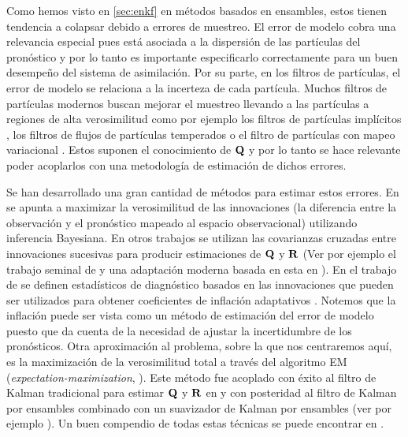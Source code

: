 
Como hemos visto en \ref{sec:enkf} en métodos basados en ensambles, estos tienen tendencia a colapsar debido a errores de muestreo. El error de modelo cobra una relevancia especial pues está asociada a la dispersión de las partículas del pronóstico y por lo tanto es importante especificarlo correctamente para un buen desempeño del sistema de asimilación. Por su parte, en los filtros de partículas, el error de modelo se relaciona a la incerteza de cada partícula. Muchos filtros de partículas modernos buscan mejorar el muestreo llevando a las partículas a regiones de alta verosimilitud como por ejemplo los filtros de partículas implícitos \citep{Chorin2009, Atkins2013, Zhu2016}, los filtros de flujos de partículas temperados \citep{Daum2009} o el filtro de partículas con mapeo variacional \citep{Pulido2019}. Estos suponen el conocimiento de $\mathbf{Q}$ y por lo tanto se hace relevante poder acoplarlos con una metodología de estimación de dichos errores.

Se han desarrollado una gran cantidad de métodos para estimar estos errores. En \cite{Stroud2018} se apunta a maximizar la verosimilitud de las innovaciones (la diferencia entre la observación y el pronóstico mapeado al espacio observacional) utilizando inferencia Bayesiana. En otros trabajos se utilizan las covarianzas cruzadas entre innovaciones sucesivas para producir estimaciones de $\mathbf{Q}$ y $\mathbf{R}$ (Ver por ejemplo el trabajo seminal de \cite{Mehra1970} y una adaptación moderna basada en esta en \cite{Berry2013}). En el trabajo de \cite{Desroziers2005} se definen estadísticos de diagnóstico basados en las innovaciones que pueden ser utilizados para obtener coeficientes de inflación adaptativos \citep{Li2009}. Notemos que la inflación puede ser vista como un método de estimación del error de modelo puesto que da cuenta de la necesidad de ajustar la incertidumbre de los pronósticos. Otra aproximación al problema, sobre la que nos centraremos aquí, es la maximización de la verosimilitud total a través del algoritmo EM (\textit{expectation-maximization}, \cite{Dempster1977}). Este método fue acoplado con éxito al filtro de Kalman tradicional para estimar $\mathbf{Q}$ y $\mathbf{R}$ en \cite{Shumway1982} y con posteridad al filtro de Kalman por ensambles combinado con un suavizador de Kalman por ensambles (ver por ejemplo \cite{Dreano2017}). Un buen compendio de todas estas técnicas se puede encontrar en \cite{Tandeo2020}.

